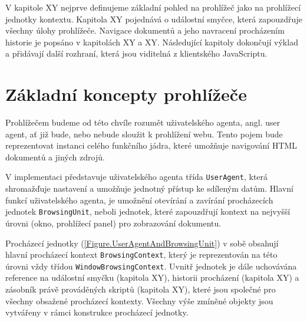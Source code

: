 V kapitole XY nejprve definujeme základní pohled na prohlížeč jako na prohlížecí jednotky kontextu. Kapitola XY pojednává o událostní smyčce, která zapouzdřuje všechny úlohy prohlížeče. Navigace dokumentů a jeho navracení procházením historie je popsáno v kapitolách XY a XY. Následující kapitoly dokončují výklad a přidávají další rozhraní, která jsou viditelná z klientského JavaScriptu. 

\section{Základní koncepty prohlížeče}
\label{Chapter.Implementation.BasicConcepts}

Prohlížečem budeme od této chvíle rozumět uživatelského agenta, angl. user agent, ať již bude, nebo nebude sloužit k prohlížení webu. Tento pojem bude reprezentovat instanci celého funkčního jádra, které umožňuje navigování HTML dokumentů a jiných zdrojů.

V implementaci představuje uživatelského agenta třída \texttt{UserAgent}, která shromažďuje nastavení a umožňuje jednotný přístup ke sdíleným datům. Hlavní funkcí uživatelského agenta, je umožnění otevírání a zavírání procházecích jednotek \texttt{BrowsingUnit}, neboli jednotek, které zapouzdřují kontext na nejvyšší úrovni (okno, prohlížecí panel) pro zobrazování dokumentu. 

Procházecí jednotky (\ref{Figure.UserAgentAndBrowsingUnit}) v sobě obsahují hlavní procházecí kontext \texttt{BrowsingContext}, který je reprezentován na této úrovni vždy třídou \texttt{WindowBrowsingContext}. Uvnitř jednotek je dále uchovávána reference na událostní smyčku (kapitola XY), historii procházení (kapitola XY) a zásobník právě prováděných skriptů (kapitola XY), které jsou společné pro všechny obsažené procházecí kontexty. Všechny výše zmíněné objekty jsou vytvářeny v rámci konstrukce procházecí jednotky.

